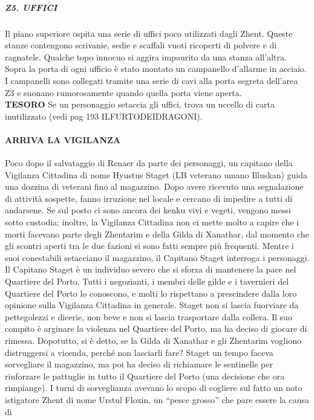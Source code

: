 \documentclass{article}
\begin{document}
\subparagraph{Z5. UFFICI}
Il piano superiore ospita una serie di uffici poco utilizzati
dagli Zhent. Queste stanze contengono scrivanie, sedie e
scaffali vuoti ricoperti di polvere e di ragnatele. Qualche
topo innocuo si aggira impaurito da una stanza all'altra.
Sopra la porta di ogni ufficio è stato montato un
campanello d'allarme in acciaio. I campanelli sono collegati
tramite una serie di cavi alla porta segreta dell'area Z3 e
suonano rumorosamente quando quella porta viene aperta. \\

\textbf{TESORO}
Se un personaggio setaccia gli uffici, trova un uccello di
carta inutilizzato (vedi pag 193 ILFURTODEIDRAGONI).

\paragraph{ARRIVA LA VIGILANZA}
Poco dopo il salvataggio di Renaer da parte dei personaggi,
un capitano della Vigilanza Cittadina di nome Hyustus
Staget (LB veterano umano Illuskan) guida una dozzina
di veterani fino al magazzino. Dopo avere ricevuto una
segnalazione di attività sospette, fanno irruzione nel locale
e cercano di impedire a tutti di andarsene. Se sul posto ci
sono ancora dei kenku vivi e vegeti, vengono messi sotto
custodia; inoltre, la Vigilanza Cittadina non ci mette molto
a capire che i morti facevano parte degli Zhentarim e della
Gilda di Xanathar, dal momento che gli scontri aperti tra
le due fazioni si sono fatti sempre più frequenti. Mentre i
suoi conestabili setacciano il magazzino, il Capitano Staget
interroga i personaggi.
Il Capitano Staget è un individuo severo che si sforza
di mantenere la pace nel Quartiere del Porto. Tutti i
negozianti, i membri delle gilde e i tavernieri del Quartiere
del Porto lo conoscono, e molti lo rispettano a prescindere
dalla loro opinione sulla Vigilanza Cittadina in generale.
Staget non si lascia fuorviare da pettegolezzi e dicerie, non
beve e non si lascia trasportare dalla collera. Il suo compito
è arginare la violenza nel Quartiere del Porto, ma ha deciso
di giocare di rimessa. Dopotutto, si è detto, se la Gilda di
Xanathar e gli Zhentarim vogliono distruggersi a vicenda,
perché non lasciarli fare?
Staget un tempo faceva sorvegliare il magazzino, ma
poi ha deciso di richiamare le sentinelle per rinforzare le
pattuglie in tutto il Quartiere del Porto (una decisione che
ora rimpiange). I turni di sorveglianza avevano lo scopo di
cogliere sul fatto un noto istigatore Zhent di nome Urstul
Floxin, un “pesce grosso” che pare essere la causa di
\end{document}
